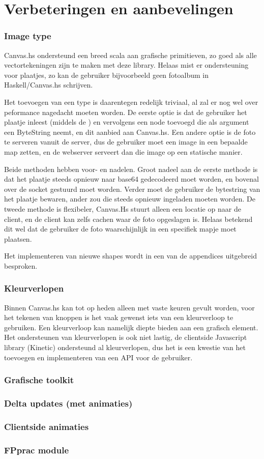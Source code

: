 \section{Verbeteringen en aanbevelingen}
\subsubsection{Image type}
Canvas.hs ondersteund een breed scala aan grafische primitieven, zo goed als alle vectortekeningen zijn te maken met deze library. Helaas mist er ondersteuning voor plaatjes, zo kan de gebruiker bijvoorbeeld geen fotoalbum in Haskell/Canvas.hs schrijven.

Het toevoegen van een  type is daarentegen redelijk triviaal, al zal er nog wel over peformance nagedacht moeten worden. De eerste optie is dat de gebruiker het plaatje inleest (middels de ) en vervolgens een  node toevoegd die als argument een ByteString neemt, en dit aanbied aan Canvas.hs. Een andere optie is de foto te serveren vanuit de server, dus de gebruiker moet een image in een bepaalde map zetten, en de webserver serveert dan die image op een statische manier.

Beide methoden hebben voor- en nadelen. Groot nadeel aan de eerste methode is dat het plaatje steeds opnieuw naar base64 gedecodeerd moet worden, en bovenal over de socket gestuurd moet worden. Verder moet de gebruiker de bytestring van het plaatje bewaren, ander zou die steeds opnieuw ingeladen moeten worden. De tweede methode is flexibeler, Canvas.Hs stuurt alleen een locatie op naar de client, en de client kan zelfs cachen waar de foto opgeslagen is. Helaas betekend dit wel dat de gebruiker de foto waarschijnlijk in een specifiek mapje moet plaatsen.

Het implementeren van nieuwe shapes wordt in een van de appendices uitgebreid besproken.

\subsubsection{Kleurverlopen}
Binnen Canvas.hs kan tot op heden alleen met vaste keuren gevult worden, voor het tekenen van knoppen is het vaak gewenst iets van een kleurverloop te gebruiken. Een kleurverloop kan namelijk diepte bieden aan een grafisch element. Het ondersteunen van kleurverlopen is ook niet lastig, de clientside Javascript library (Kinetic) ondersteund al kleurverlopen, dus het is een kwestie van het toevoegen en implementeren van een API voor de gebruiker.

\subsubsection{Grafische toolkit}
\subsubsection{Delta updates (met animaties)}
\subsubsection{Clientside animaties}
\subsubsection{FPprac module}
